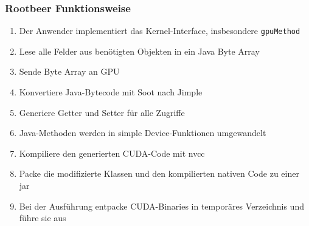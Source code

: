 \begin{frame}
    \frametitle{Rootbeer Funktionsweise}
    \begin{enumerate}
        \item Der Anwender implementiert das Kernel-Interface, insbesondere \lstinline!gpuMethod!
        \item Lese alle Felder aus benötigten Objekten in ein Java Byte Array
        \item Sende Byte Array an GPU
        \item Konvertiere Java-Bytecode mit Soot nach Jimple %
        \item Generiere Getter und Setter für alle Zugriffe %
        \item Java-Methoden werden in simple Device-Funktionen umgewandelt %
        \item Kompiliere den generierten CUDA-Code mit nvcc
        \item Packe die modifizierte Klassen und den kompilierten nativen Code zu einer jar
        \item Bei der Ausführung entpacke CUDA-Binaries in temporäres Verzeichnis und führe sie aus
    \end{enumerate}

\end{frame}

